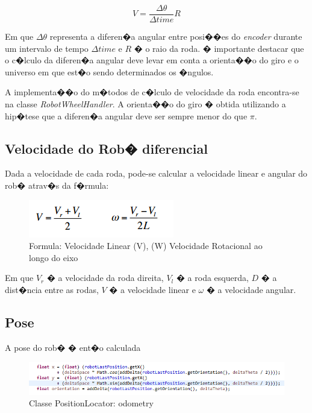 \documentclass[twoside,conference,a4paper]{IEEEtran}
\begin{document}
\[ V = \frac{\Delta \theta}{\Delta time} R \]

Em que \( \Delta \theta \) representa a diferen�a angular entre posi��es do \textit{encoder} durante um intervalo de tempo \(\Delta time\) e \(R\) � o raio da roda. � importante destacar que o c�lculo da diferen�a angular deve levar em conta a orienta��o do giro e o universo em que est�o sendo determinados os �ngulos.  

A implementa��o do m�todos de c�lculo de velocidade da roda encontra-se na classe \textit{RobotWheelHandler}. A orienta��o do giro � obtida utilizando a hip�tese que a diferen�a angular deve ser sempre menor do que \( \pi \). 

\subsection{Velocidade do Rob� diferencial}
Dada a velocidade de cada roda, pode-se calcular a velocidade linear e angular do rob� atrav�s da f�rmula:

\begin{figure}[ht]
\centering
\includegraphics[width=1\hsize]{images/formula1.png}
\caption{Formula: Velocidade Linear (V), (W) Velocidade Rotacional ao longo do eixo}
\label{fig:fig1}
\end{figure}

Em que \(V_r\) � a velocidade da roda direita, \(V_l\) � a roda esquerda, \(D\) � a dist�ncia entre as rodas, \(V\) � a velocidade linear e \(\omega\) � a velocidade angular. 

\subsection{Pose}
A pose do rob� � ent�o calculada 

\begin{figure}[ht]
\centering
\includegraphics[width=1\hsize]{images/code-1.png}
\caption{Classe PositionLocator: odometry}
\label{fig:fig2}
\end{figure}
\end{document}
